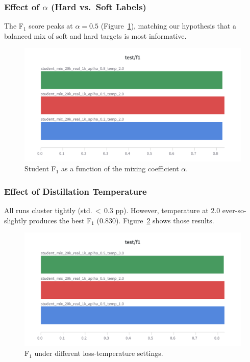 \documentclass[11pt]{article}
\begin{document}
\subsubsection{Effect of $\alpha$ (Hard vs.\ Soft Labels)}
\label{sec:alpha}
The F$_1$ score peaks at $\alpha=0.5$
(Figure~\ref{fig:alpha}), matching our hypothesis that a balanced mix
of soft and hard targets is most informative.

\begin{figure}[htbp]
  \centering
  \includegraphics[width=.8\linewidth]{figures/student_alpha_f1.png}
  \caption{Student F$_1$ as a function of the mixing coefficient
  $\alpha$.}
  \label{fig:alpha}
\end{figure}

\subsubsection{Effect of Distillation Temperature}
\label{sec:temp}
All runs cluster tightly (std.\,$<$\,0.3 pp). However, temperature at
2.0 ever-so-slightly produces the best F$_1$ (0.830).
Figure~\ref{fig:temp} shows those results.
\begin{figure}[htbp]
  \centering
  \includegraphics[width=.8\linewidth]{figures/student_temp.png}
  \caption{F$_1$ under different loss-temperature settings.}
  \label{fig:temp}
\end{figure}
\end{document}
